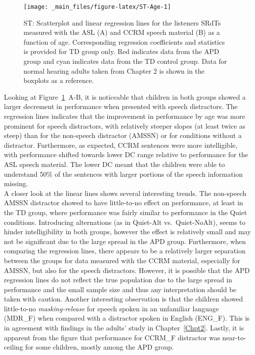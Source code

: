 \documentclass[a4paper, twoside]{templates/ociamthesis}
\begin{document}
\begin{figure}[h]

{\centering \texttt{[image: \_main\_files/figure-latex/ST-Age-1]} 

}

\caption{ST: Scatterplot and linear regression lines for the listeners SRdTs measured with the ASL (A) and CCRM speech material (B) as a function of age. Corresponding regression coefficients and statistics is provided for TD group only. Red indicates data from the APD group and cyan indicates data from the TD control group. Data for normal hearing adults taken from Chapter 2 is shown in the boxplots as a reference.}\label{fig:ST-Age}
\end{figure}

Looking at Figure~\ref{fig:ST-Age}~A-B, it is noticeable that children in both groups showed a larger decrement in performance when presented with speech distractors. The regression lines indicates that the improvement in performance by age was more prominent for speech distractors, with relatively steeper slopes (at least twice as steep) than for the non-speech distractor (AMSSN) or for conditions without a distractor. Furthermore, as expected, CCRM sentences were more intelligible, with performance shifted towards lower DC range relative to performance for the ASL speech material. The lower DC meant that the children were able to understand 50\% of the sentences with larger portions of the speech information missing.\\

A closer look at the linear lines shows several interesting trends. The non-speech AMSSN distractor showed to have little-to-no effect on performance, at least in the TD group, where performance was fairly similar to performance in the Quiet conditions. Introducing alternations (as in Quiet-Alt vs.~Quiet-NoAlt), seems to hinder intelligibility in both groups, however the effect is relatively small and may not be significant due to the large spread in the APD group. Furthermore, when comparing the regression lines, there appears to be a relatively larger separation between the groups for data measured with the CCRM material, especially for AMSSN, but also for the speech distractors. However, it is possible that the APD regression lines do not reflect the true population due to the large spread in performance and the small sample size and thus any interpretation should be taken with caution. Another interesting observation is that the children showed little-to-no \emph{masking-release} for speech spoken in an unfamiliar language (MDR\_F) when compared with a distractor spoken in English (ENG\_F). This is in agreement with findings in the adults' study in Chapter~\ref{Chpt2}. Lastly, it is apparent from the figure that performance for CCRM\_F distractor was near-to-ceiling for some children, mostly among the APD group.\\
\end{document}
